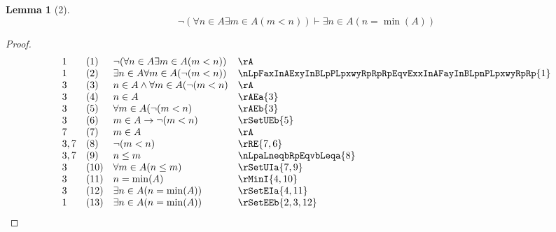 \documentclass{book}
\theoremstyle{plain}
\newtheorem*{lemma}{Lemma} %
\theoremstyle{remark}
\theoremstyle{definition}
\begin{document}
\begin{lemma}[2]
\[\neg(\forall n\in A\exists m\in A(m<n))\vdash \exists n\in A(n=\min(A))\]
\end{lemma}
\begin{proof}
	\[
	\begin{array}{llll}
        1  & (1) & \neg(\forall n\in A\exists m\in A(m<n)) & \rA \\
        1  & (2) & \exists n\in A \forall m\in A(\neg(m<n)) & \nLpFaxInAExyInBLpPLpxwyRpRpRpEqvExxInAFayInBLpnPLpxwyRpRp{1} \\
        3  & (3) & n\in A\land \forall m\in A(\neg(m<n) & \rA\\
        3  & (4) & n\in A & \rAEa{3}\\
        3  & (5) & \forall m\in A(\neg(m<n) & \rAEb{3}\\
        3  & (6) & m\in A\rightarrow \neg(m<n) & \rSetUEb{5}\\
        7  & (7) & m\in A & \rA\\
        3,7& (8) & \neg(m<n) & \rRE{7,6}\\
        3,7& (9) & n\leq m & \nLpaLneqbRpEqvbLeqa{8}\\
        3  & (10) & \forall m\in A(n\leq m) & \rSetUIa{7,9}\\
        3  & (11) & n=\min(A) & \rMinI{4,10}\\
        3  & (12) & \exists n\in A(n=\min(A)) & \rSetEIa{4,11}\\
        1  & (13) & \exists n\in A(n=\min(A)) & \rSetEEb{2,3,12}\\
	\end{array}
	\]
\end{proof}
\end{document}
